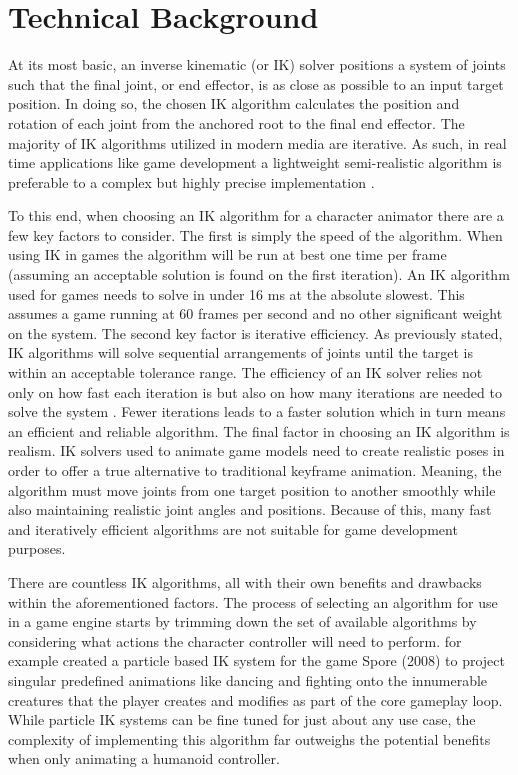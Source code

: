 \documentclass[10pt,twocolumn]{article}
\begin{document}
\section{Technical Background}
At its most basic, an inverse kinematic (or IK) solver positions a system of joints such that the final joint, or end effector, is as close as possible to an input target position. In doing so, the chosen IK algorithm calculates the position and rotation of each joint from the anchored root to the final end effector. The majority of IK algorithms utilized in modern media are iterative. As such, in real time applications like game development a lightweight semi-realistic algorithm is preferable to a complex but highly precise implementation \cite{litReview}\cite{ZucconiIK}.

To this end, when choosing an IK algorithm for a character animator there are a few key factors to consider. The first is simply the speed of the algorithm. When using IK in games the algorithm will be run at best one time per frame (assuming an acceptable solution is found on the first iteration). An IK algorithm used for games needs to solve in under 16 ms at the absolute slowest. This assumes a game running at 60 frames per second and no other significant weight on the system. The second key factor is iterative efficiency. As previously stated, IK algorithms will solve sequential arrangements of joints until the target is within an acceptable tolerance range. The efficiency of an IK solver relies not only on how fast each iteration is but also on how many iterations are needed to solve the system \cite{litReview}\cite{baseFABRIK}. Fewer iterations leads to a faster solution which in turn means an efficient and reliable algorithm. The final factor in choosing an IK algorithm is realism. IK solvers used to animate game models need to create realistic poses in order to offer a true alternative to traditional keyframe animation. Meaning, the algorithm must move joints from one target position to another smoothly while also maintaining realistic joint angles and positions. Because of this, many fast and iteratively efficient algorithms are not suitable for game development purposes. 

There are countless IK algorithms, all with their own benefits and drawbacks within the aforementioned factors. The process of selecting an algorithm for use in a game engine starts by trimming down the set of available algorithms by considering what actions the character controller will need to perform. \textcite{spore} for example created a particle based IK system for the game Spore (2008) to project singular predefined animations like dancing and fighting onto the innumerable creatures that the player creates and modifies as part of the core gameplay loop. While particle IK systems can be fine tuned for just about any use case, the complexity of implementing this algorithm far outweighs the potential benefits when only animating a humanoid controller. 
\end{document}

